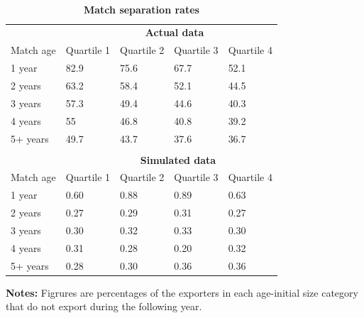 \documentclass[12pt]{article}
\begin{document}
\begin{table}[tbp]
\caption{\textbf{Match separation rates}}
\label{tab:match_exit_compare}\centering
{\small \ }
\par
{\small 
\begin{tabular}{lllll}
\hline\hline
& \multicolumn{4}{l}{\ \ \ \ \ \ \ \ \ \ \ \ \ \ \ \ \textbf{Actual data}}
\\ \cline{2-5}
Match age & Quartile 1 & Quartile 2 & Quartile 3 & Quartile 4 \\ \hline
1 year & 82.9 & 75.6 & 67.7 & 52.1 \\ 
2 years & 63.2 & 58.4 & 52.1 & 44.5 \\ 
3 years & 57.3 & 49.4 & 44.6 & 40.3 \\ 
4 years & 55 & 46.8 & 40.8 & 39.2 \\ 
5+ years & 49.7 & 43.7 & 37.6 & 36.7 \\ 
&  &  &  &  \\ 
& \multicolumn{4}{l}{\ \ \ \ \ \ \ \ \ \ \ \ \ \ \ \textbf{Simulated data}}
\\ \cline{2-5}
Match age & Quartile 1 & Quartile 2 & Quartile 3 & Quartile 4 \\ \hline
1 year & 0.60 & 0.88 & 0.89 & 0.63 \\ 
2 years & 0.27 & 0.29 & 0.31 & 0.27 \\ 
3 years & 0.30 & 0.32 & 0.33 & 0.30 \\ 
4 years & 0.31 & 0.28 & 0.20 & 0.32 \\ 
5+ years & 0.28 & 0.30 & 0.36 & 0.36 \\ \hline
\end{tabular}
}
\par
{\endcenter%
\begin{tablenotes}
\item \textbf{Notes:} Figrures are percentages of the exporters in each age-initial size category that do not export during the following year.
\end{tablenotes}}
\end{table}
\end{document}
